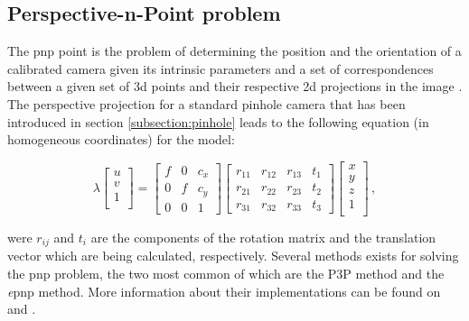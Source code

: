 \subsection{Perspective-n-Point problem}
The \acrfull{pnp} point is the problem of determining the position and the orientation of a calibrated camera given its intrinsic parameters and a set of correspondences between a given set of \acrshort{3d} points and their respective \acrshort{2d} projections in the image \cite{10.1007/s11263-008-0152-6}.
The perspective projection for a standard pinhole camera that has been introduced in section \ref{subsection:pinhole} leads to the following equation (in homogeneous coordinates) for the model:

\begin{equation*}
  \lambda
  \begin{bmatrix}
    u \\
    v \\
    1 \\
  \end{bmatrix}
  =
  \begin{bmatrix}
    f & 0 & c_x \\
    0 & f & c_y \\
    0 & 0 & 1
  \end{bmatrix}
  \begin{bmatrix}
    r_{11} & r_{12} & r_{13} & t_1 \\
    r_{21} & r_{22} & r_{23} & t_2 \\
    r_{31} & r_{32} & r_{33} & t_3
  \end{bmatrix}
  \begin{bmatrix}
    x \\
    y \\
    z \\
    1 \\
  \end{bmatrix} \,,
\end{equation*}

were $r_{ij}$ and $t_i$ are the components of the rotation matrix and the translation vector which are being calculated, respectively.
Several methods exists for solving the \acrshort{pnp} problem, the two most common of which are the P3P method and the \textit{e}\acrshort{pnp} method. More information about their implementations can be found on  \cite{XiaoShanGao2003} \cite{Torr2000} and \cite{10.1007/s11263-008-0152-6}.


